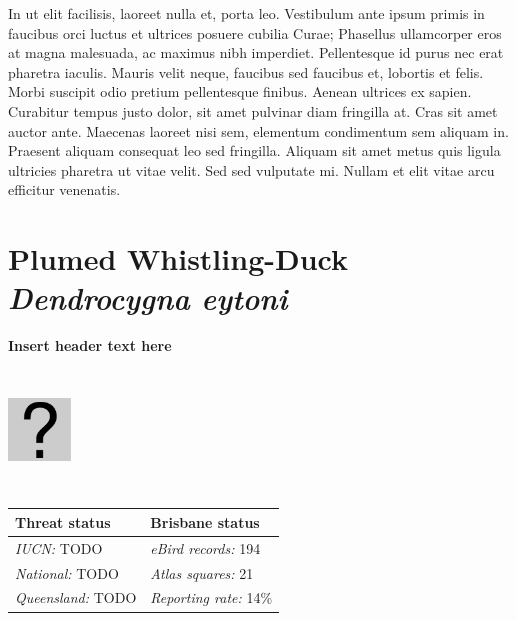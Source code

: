 \documentclass[12pt,openany,oneside]{book}
\let\origfigure\figure
\let\endorigfigure\endfigure
\renewenvironment{figure}[1][2] {
  \expandafter\origfigure\expandafter[H]
} {
  \endorigfigure
}
\theoremstyle{definition}
\theoremstyle{definition}
\theoremstyle{definition}
\theoremstyle{remark}
\begin{document}
In ut elit facilisis, laoreet nulla et, porta leo. Vestibulum ante ipsum
primis in faucibus orci luctus et ultrices posuere cubilia Curae;
Phasellus ullamcorper eros at magna malesuada, ac maximus nibh
imperdiet. Pellentesque id purus nec erat pharetra iaculis. Mauris velit
neque, faucibus sed faucibus et, lobortis et felis. Morbi suscipit odio
pretium pellentesque finibus. Aenean ultrices ex sapien. Curabitur
tempus justo dolor, sit amet pulvinar diam fringilla at. Cras sit amet
auctor ante. Maecenas laoreet nisi sem, elementum condimentum sem
aliquam in. Praesent aliquam consequat leo sed fringilla. Aliquam sit
amet metus quis ligula ultricies pharetra ut vitae velit. Sed sed
vulputate mi. Nullam et elit vitae arcu efficitur venenatis.

\clearpage

\hypertarget{plumed-whistling-duck-dendrocygna-eytoni}{%
\section{\texorpdfstring{Plumed Whistling-Duck \emph{Dendrocygna
eytoni}}{Plumed Whistling-Duck Dendrocygna eytoni}}\label{plumed-whistling-duck-dendrocygna-eytoni}}


\textbf{Insert header text here}

\begin{figure}
\centering
\includegraphics[width=63px,height=120px]{assets/profile/missing.png}
\caption{Insert caption here.}
\end{figure}

\begin{tabu} to 
\toprule
Threat status & Brisbane status\\
\midrule
\textit{IUCN:} TODO & \textit{eBird records:} 194\\
\textit{National:} TODO & \textit{Atlas squares:} 21\\
\textit{Queensland:} TODO & \textit{Reporting rate:} 14\%\\
\bottomrule
\end{tabu}
\end{document}
